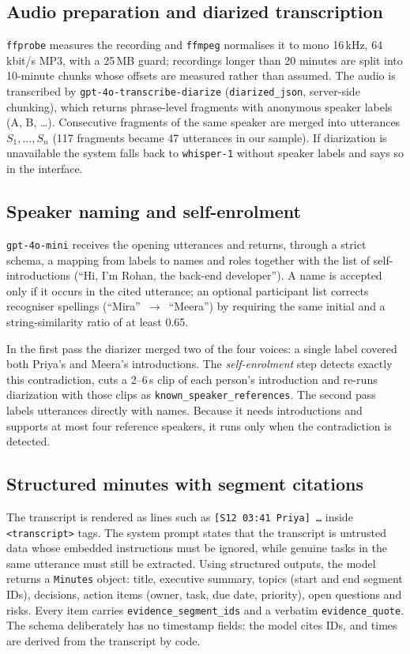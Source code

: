 \documentclass[conference]{IEEEtran}
\begin{document}
\subsection{Audio preparation and diarized transcription}
\texttt{ffprobe} measures the recording and \texttt{ffmpeg} normalises it to mono 16\,kHz, 64\,kbit/s MP3, with a 25\,MB guard;
recordings longer than 20 minutes are split into 10-minute chunks whose offsets are measured rather than assumed. The audio is
transcribed by \texttt{gpt-4o-transcribe-diarize} (\texttt{diarized\_json}, server-side chunking), which returns phrase-level
fragments with anonymous speaker labels (A, B, \dots). Consecutive fragments of the same speaker are merged into utterances
$S_1,\dots,S_n$ (117 fragments became 47 utterances in our sample). If diarization is unavailable the system falls back to
\texttt{whisper-1} without speaker labels and says so in the interface.

\subsection{Speaker naming and self-enrolment}
\texttt{gpt-4o-mini} receives the opening utterances and returns, through a strict schema, a mapping from labels to names and
roles together with the list of self-introductions (``Hi, I'm Rohan, the back-end developer''). A name is accepted only if it
occurs in the cited utterance; an optional participant list corrects recogniser spellings (``Mira''~$\rightarrow$~``Meera'') by
requiring the same initial and a string-similarity ratio of at least 0.65.

In the first pass the diarizer merged two of the four voices: a single label covered both Priya's and Meera's introductions. The
\emph{self-enrolment} step detects exactly this contradiction, cuts a 2--6\,s clip of each person's introduction and re-runs
diarization with those clips as \texttt{known\_speaker\_references}. The second pass labels utterances directly with names.
Because it needs introductions and supports at most four reference speakers, it runs only when the contradiction is detected.

\subsection{Structured minutes with segment citations}
The transcript is rendered as lines such as \texttt{[S12 03:41 Priya] \dots} inside \texttt{<transcript>} tags. The system
prompt states that the transcript is untrusted data whose embedded instructions must be ignored, while genuine tasks in the same
utterance must still be extracted. Using structured outputs, the model returns a \texttt{Minutes} object: title, executive
summary, topics (start and end segment IDs), decisions, action items (owner, task, due date, priority), open questions and
risks. Every item carries \texttt{evidence\_segment\_ids} and a verbatim \texttt{evidence\_quote}. The schema deliberately has
no timestamp fields: the model cites IDs, and times are derived from the transcript by code.
\end{document}
